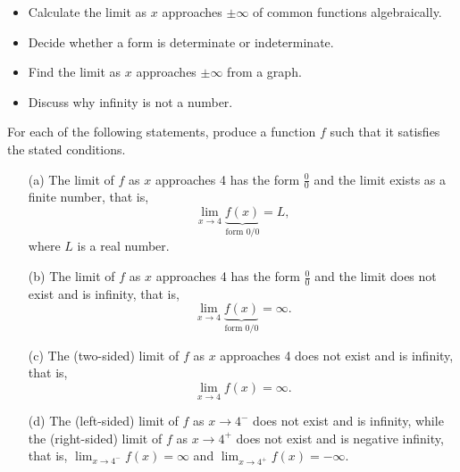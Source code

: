 \documentclass[handout,nooutcomes]{ximera}
\begin{document}
\begin{itemize}
  \item
    Calculate the limit as $x$ approaches $\pm\infty$ of common functions algebraically.

  \item
    Decide whether a form is determinate or indeterminate. 

  \item
    Find the limit as $x$ approaches $\pm\infty$ from a graph. 

  \item 
    Discuss why infinity is not a number. 
\end{itemize}
\newpage

\begin{problem}
  \label{problem:warmup-for-forms}
  For each of the following statements, produce a function $f$ such that it satisfies the stated conditions.
  \begin{itemize}
    \item[(a)]
      The limit of $f$ as $x$ approaches 4 has the form $\frac{0}{0}$ and the limit exists as a finite number, that is, 
      \[
        \lim_{x \to 4} \underbrace{f(x)}_{\text{form $0/0$}} = L,
      \]
      where $L$ is a real number.

    \item[(b)]
      The limit of $f$ as $x$ approaches 4 has the form $\frac{0}{0}$ and the limit does not exist and is infinity, that is,
      \[
        \lim_{x \to 4} \underbrace{f(x)}_{\text{form $0/0$}} = \infty.
      \]

    \item[(c)]
      The (two-sided) limit of $f$ as $x$ approaches 4 does not exist and is infinity, that is,
      \[
        \lim_{x \to 4} f(x) = \infty.
      \]

    \item[(d)]
      The (left-sided) limit of $f$ as $x \to 4^-$ does not exist and is infinity, while the (right-sided) limit of $f$ as $x \to 4^+$ does not exist and is negative infinity, that is, $\lim_{x \to 4^-} f(x) = \infty$ and $\lim_{x \to 4^+} f(x) = -\infty$.
  \end{itemize}
\end{problem}
\end{document}
